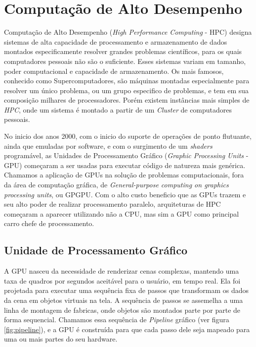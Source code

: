 \section{Computação de Alto Desempenho}\label{GPGPU}

    Computação de Alto Desempenho (\textit{High Performance Computing} - HPC) designa sistemas de alta capacidade de processamento
e armazenamento de dados montados especificamente resolver grandes problemas científicos, para os quais computadores pessoais não
são o suficiente. Esses sistemas variam em tamanho, poder computacional e capacidade de armazenamento. Os mais famosos,
conhecido como Supercomputadores, são máquinas montadas especialmente para resolver um único problema, ou um grupo
especifico de problemas, e tem em sua composição milhares de processadores. Porém existem instâncias mais simples de
\textit{HPC}, onde um sistema é montado a partir de um \textit{Cluster} de computadores pessoais.

    No inicio dos anos 2000, com o inicio do suporte de operações de ponto flutuante, ainda que emuladas por software,
e com o surgimento de um \textit{shaders} programável, as Unidades de Processamento Gráfico
(\textit{Graphic Processing Units} - GPU) começaram a ser usadas para executar código de natureza mais genérica.
Chamamos a aplicação de GPUs na solução de problemas computacionais, fora da área de computação gráfica,
de \textit{General-purpose computing on graphics processing units}, ou GPGPU. Com o alto custo beneficio que as GPUs
trazem e seu alto poder de realizar processamento paralelo, arquiteturas de HPC começaram a aparecer utilizando não a
CPU, mas sim a GPU como principal carro chefe de processamento.

\subsection{Unidade de Processamento Gráfico}
    A GPU nasceu da necessidade de renderizar cenas complexas, mantendo uma taxa de quadros por segundos
aceitável para o usuário, em tempo real. Ela foi projetada para executar uma sequência fixa de passos que transformam
os dados da cena em objetos virtuais na tela. A sequência de passos se assemelha a uma linha de montagem de fabricas,
onde objetos são montados parte por parte de forma sequencial. Chamamos essa sequência de \textit{Pipeline} gráfico
(ver figura \ref{fig:pipeline}), e a GPU é construída para que cada passo dele seja mapeado para uma ou mais partes do
seu hardware.

